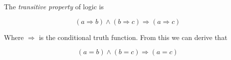\documentclass{article}
\begin{document}
The \emph{transitive property} of logic is 

$$ (a \Rightarrow b) \land (b \Rightarrow c) \Rightarrow (a \Rightarrow c) $$

Where $\Rightarrow$ is the conditional truth function.  From this we can derive that

$$ (a = b) \land (b = c) \Rightarrow (a = c) $$
\end{document}

